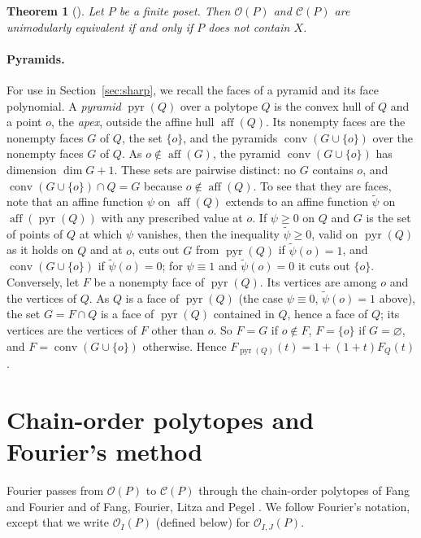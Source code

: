 \documentclass[11pt]{article}
\newtheorem{theorem}{Theorem}[section]
\theoremstyle{definition}
\theoremstyle{remark}
\newcommand{\OO}{\mathcal O}
\newcommand{\CC}{\mathcal C}
\newcommand{\aff}{\operatorname{aff}}
\newcommand{\pyr}{\operatorname{pyr}}
\begin{document}
\begin{theorem}[{\cite[Theorem~2.1]{HL}}]\label{thm:HL}
Let $P$ be a finite poset. Then $\OO(P)$ and $\CC(P)$ are unimodularly
equivalent if and only if $P$ does not contain $X$.
\end{theorem}

\paragraph{Pyramids.} For use in Section~\ref{sec:sharp}, we recall the faces of a pyramid and its face polynomial. A \emph{pyramid} $\pyr(Q)$ over a polytope $Q$
is the convex hull of $Q$ and a point $o$, the \emph{apex}, outside the affine hull $\aff(Q)$. Its nonempty faces are the nonempty faces $G$ of $Q$, the set $\{o\}$, and the pyramids $\operatorname{conv}(G\cup\{o\})$ over the nonempty faces $G$ of $Q$. As $o\notin\aff(G)$, the pyramid $\operatorname{conv}(G\cup\{o\})$ has dimension $\dim G+1$. These sets are pairwise distinct: no $G$ contains $o$, and $\operatorname{conv}(G\cup\{o\})\cap Q=G$ because $o\notin\aff(Q)$. To see that they are faces, note that an affine function $\psi$ on $\aff(Q)$ extends to an affine function $\tilde\psi$ on
$\aff(\pyr(Q))$ with any prescribed value at $o$. If $\psi\geq0$ on $Q$ and $G$ is the set of points of $Q$ at which $\psi$ vanishes,
then the inequality $\tilde\psi\geq0$, valid on $\pyr(Q)$ as it holds on $Q$ and at $o$, cuts out $G$ from $\pyr(Q)$ if $\tilde\psi(o)=1$, and $\operatorname{conv}(G\cup\{o\})$ if $\tilde\psi(o)=0$; for $\psi\equiv1$ and $\tilde\psi(o)=0$ it cuts out $\{o\}$. Conversely, let $F$ be a
nonempty face of $\pyr(Q)$. Its vertices are among $o$ and the vertices of $Q$. As $Q$ is a face of $\pyr(Q)$ (the case $\psi\equiv0$, $\tilde\psi(o)=1$ above), the set $G=F\cap Q$ is a face of $\pyr(Q)$ contained in $Q$, hence a face of $Q$; its vertices are the vertices of $F$ other than $o$. So
$F=G$ if $o\notin F$, $F=\{o\}$ if $G=\varnothing$, and $F=\operatorname{conv}(G\cup\{o\})$ otherwise. Hence
$F_{\pyr(Q)}(t)=1+(1+t)F_Q(t)$.

\section{Chain-order polytopes and Fourier's method}\label{sec:cited}
Fourier \cite{Fourier} passes from $\OO(P)$ to $\CC(P)$ through the chain-order polytopes of Fang and Fourier \cite{FF} and of Fang, Fourier, Litza and Pegel \cite{FFLP}. We follow Fourier's notation, except that we write $\OO_I(P)$ (defined below) for $\OO_{I,J}(P)$.
\end{document}
